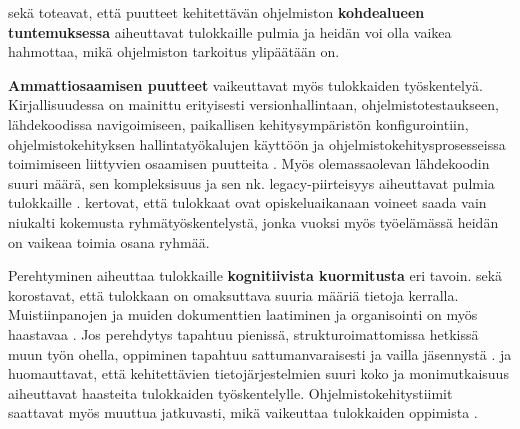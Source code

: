 \documentclass[utf8]{gradu3}
\begin{document}
\textcite{matturro-ym-2017} sekä \textcite{dagenais-ym-2010} toteavat, että puutteet kehitettävän ohjelmiston \textbf{kohdealueen tuntemuksessa} aiheuttavat tulokkaille pulmia ja heidän voi olla vaikea hahmottaa, mikä ohjelmiston tarkoitus ylipäätään on.

\textbf{Ammattiosaamisen puutteet} vaikeuttavat myös tulokkaiden työskentelyä. Kirjallisuudessa
on mainittu erityisesti versionhallintaan, ohjelmistotestaukseen, lähdekoodissa navigoimiseen, paikallisen kehitysympäristön konfigurointiin, ohjelmistokehityksen hallintatyökalujen käyttöön ja ohjelmistokehitysprosesseissa toimimiseen liittyvien osaamisen puutteita  %
\parencites%
    {craig-ym-2018}%
    {matturro-ym-2017}%
    {dagenais-ym-2010}%
    {begel-simon-2008}%
\relax
% 
. Myös olemassaolevan lähdekoodin suuri määrä, sen kompleksisuus ja sen nk. legacy-piirteisyys aiheuttavat pulmia tulokkaille %
\parencites%
    {britto-ym-2019}%
    {viviani-murphy-2019}%
    {craig-ym-2018}
    {begel-simon-2008}%
\relax.
\textcite{craig-ym-2018} kertovat, että tulokkaat ovat opiskeluaikanaan voineet saada vain niukalti kokemusta ryhmätyöskentelystä, jonka vuoksi myös työelämässä heidän on vaikeaa toimia osana ryhmää.

Perehtyminen aiheuttaa tulokkaille \textbf{kognitiivista kuormitusta} eri tavoin. \textcite{dagenais-ym-2010} sekä \textcite{begel-simon-2008} korostavat, että tulokkaan on omaksuttava suuria määriä tietoja kerralla. Muistiinpanojen ja muiden dokumenttien laatiminen ja organisointi on myös haastavaa \parencite{radermacher-ym-2015}. Jos perehdytys tapahtuu pienissä, strukturoimattomissa hetkissä muun työn ohella, oppiminen tapahtuu sattumanvaraisesti ja vailla jäsennystä \parencite{begel-simon-2008}. \textcite{craig-ym-2018} ja \textcite{britto-ym-2019} huomauttavat, että kehitettävien tietojärjestelmien suuri koko ja monimutkaisuus aiheuttavat haasteita tulokkaiden työskentelylle. Ohjelmistokehitystiimit saattavat myös muuttua jatkuvasti, mikä vaikeuttaa tulokkaiden oppimista \parencite{britto-ym-2019}.
\end{document}
